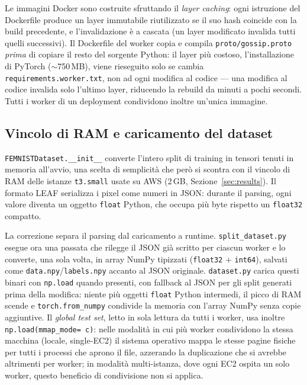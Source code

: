 Le immagini Docker sono costruite sfruttando il \emph{layer caching}: ogni
istruzione del Dockerfile produce un layer immutabile riutilizzato se il suo
hash coincide con la build precedente, e l'invalidazione è a cascata (un
layer modificato invalida tutti quelli successivi). Il Dockerfile del worker
copia e compila \texttt{proto/gossip.proto} \emph{prima} di copiare il resto
del sorgente Python: il layer più costoso, l'installazione di PyTorch
($\sim$750\,MB), viene rieseguito solo se cambia \texttt{requirements.worker.txt},
non ad ogni modifica al codice — una modifica al codice invalida solo l'ultimo
layer, riducendo la rebuild da minuti a pochi secondi. Tutti i worker di un
deployment condividono inoltre un'unica immagine.

\subsection{Vincolo di RAM e caricamento del dataset}
\texttt{FEMNISTDataset.\_\_init\_\_}
converte l'intero split di training in tensori tenuti in memoria all'avvio,
una scelta di semplicità che però si scontra con il vincolo di RAM delle
istanze \texttt{t3.small} usate su AWS (2\,GB, Sezione~\ref{sec:results}). Il
formato LEAF serializza i pixel come numeri in JSON: durante il parsing, ogni
valore diventa un oggetto \texttt{float} Python, che occupa più byte rispetto un \texttt{float32}
compatto.

La correzione separa il parsing dal caricamento a runtime.
\texttt{split\_dataset.py} esegue ora una passata che rilegge il JSON
già scritto per ciascun worker e lo converte, una sola volta, in array NumPy
tipizzati (\texttt{float32} + \texttt{int64}), salvati come
\texttt{data.npy}/\texttt{labels.npy} accanto al JSON originale.
\texttt{dataset.py} carica questi binari con \texttt{np.load} quando
presenti, con fallback al JSON per gli split generati prima della modifica:
niente più oggetti \texttt{float} Python intermedi, il picco di RAM scende
e \texttt{torch.from\_numpy} condivide la memoria con l'array NumPy
senza copie aggiuntive. Il \emph{global test set}, letto in sola lettura da
tutti i worker, usa inoltre \texttt{np.load(mmap\_mode=\textquotesingle
c\textquotesingle)}: nelle modalità in cui più worker condividono la stessa
macchina (locale, single-EC2) il sistema operativo mappa le stesse pagine
fisiche per tutti i processi che aprono il file, azzerando la duplicazione
che si avrebbe altrimenti per worker; in modalità multi-istanza, dove ogni
EC2 ospita un solo worker, questo beneficio di condivisione non si applica.

